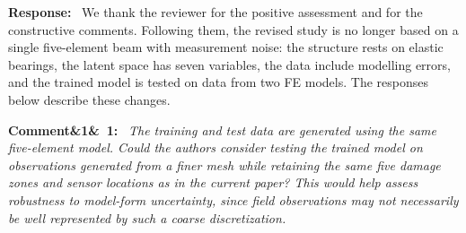 \documentclass[11pt]{article}
\newenvironment{rcomment}[1]{\par\bigskip\noindent\textbf{Comment\ifx&#1&\else\ #1\fi:}\ \itshape}{\par}
\newenvironment{response}{\par\smallskip\noindent\color{resp}\textbf{Response:}\ }{\par}
\begin{document}
\begin{response}
We thank the reviewer for the positive assessment and for the constructive comments. Following them, the revised
study is no longer based on a single five-element beam with measurement noise: the structure rests on elastic bearings,
the latent space has seven variables, the data include modelling errors, and the trained model is tested on data from
two FE models. The responses below describe these changes.
\end{response}

\begin{rcomment}{1}
The training and test data are generated using the same five-element model. Could the authors consider testing the
trained model on observations generated from a finer mesh while retaining the same five damage zones and sensor
locations as in the current paper? This would help assess robustness to model-form uncertainty, since field observations
may not necessarily be well represented by such a coarse discretization.
\end{rcomment}
\end{document}

